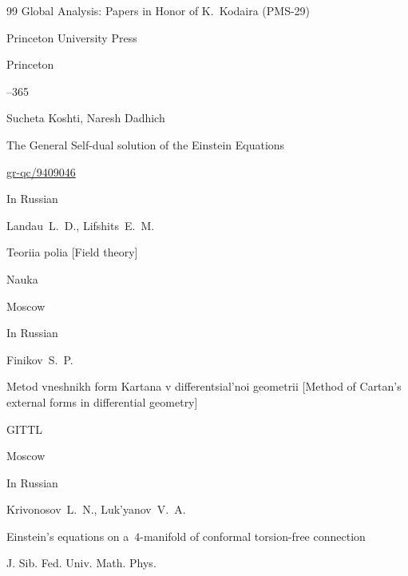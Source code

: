 \begin{thebibliography}{99}
\inbook Global Analysis: Papers in Honor of K.~Kodaira \rm (PMS-29)

\publ Princeton University Press

\publaddr Princeton 


–365





\by Sucheta Koshti, Naresh Dadhich

\preprint The General Self-dual solution of the Einstein Equations


\arxiv \href{https://arxiv.org/abs/gr-qc/9409046}{gr-qc/9409046}






\lang In Russian

\by Landau~L.~D., Lifshits~E.~M. 

\book Teoriia polia \rm [Field theory]


\publ Nauka

\publaddr Moscow





\lang In Russian

\by Finikov~S.~P.

\book Metod vneshnikh form Kartana v differentsial'noi geometrii \rm [Method of Cartan's external forms in differential geometry]


\publ GITTL

\publaddr Moscow





\lang In Russian

\by Krivonosov~L.~N., Luk'yanov~V.~A.

\paper Einstein's equations on a~$4$-manifold of conformal torsion-free connection

\jour J. Sib. Fed. Univ. Math. Phys.




\end{thebibliography}
